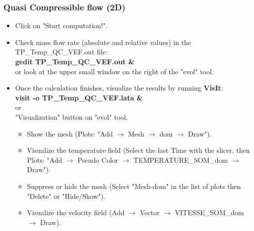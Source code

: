 \documentclass[10pt, hyperref={unicode=true,pdfusetitle, bookmarks=true,bookmarksnumbered=false,bookmarksopen=false, breaklinks=false,pdfborder={0 0l 1},backref=true,colorlinks=true,linkcolor=darkblue,pageanchor}]{beamer}
\begin{document}
\begin{frame}
\frametitle{Quasi Compressible flow (2D)}
\begin{block}{}

\begin{itemize}
\item Click on "Start computation!".
\item Check mass flow rate (absolute and relative values) in the TP\_Temp\_QC\_VEF.out file: \\
\textbf{gedit TP\_Temp\_QC\_VEF.out \&} \\
or look at the upper small window on the right of the "evol" tool.

\item Once the calculation finishes, visualize the results by running \textbf{VisIt}:\\
\textbf{visit -o TP\_Temp\_QC\_VEF.lata \&}\\
or \\
"Visualization" button on "evol" tool.
\begin{itemize}
    \item [$\circ$] Show the mesh (Plots: "Add $\rightarrow$ Mesh $\rightarrow$ dom $\rightarrow$ Draw").
    \item [$\circ$] Visualize the temperature field (Select the last Time with the slicer, then Plots: "Add $\rightarrow$ Pseudo Color $\rightarrow$ TEMPERATURE\_SOM\_dom  $\rightarrow$ Draw").
    \item [$\circ$] Suppress or hide the mesh (Select "Mesh-dom" in the list of plots then "Delete" or "Hide/Show").
    \item [$\circ$] Visualize the velocity field (Add $\rightarrow$ Vector $\rightarrow$ VITESSE\_SOM\_dom $\rightarrow$ Draw).
\end{itemize}

\end{itemize}

\end{block}
\end{frame}
\end{document}
